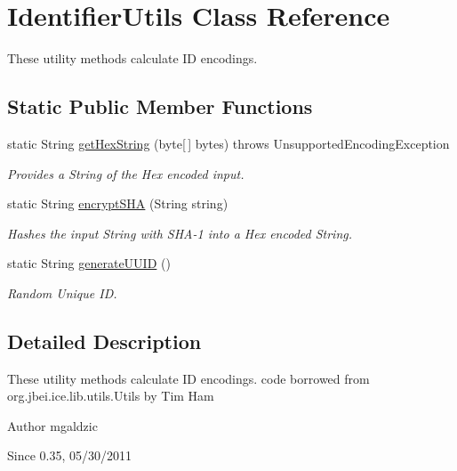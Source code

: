 \hypertarget{classorg_1_1sbolstandard_1_1lib_s_b_o_lj_1_1_identifier_utils}{
\section{IdentifierUtils Class Reference}
\label{classorg_1_1sbolstandard_1_1lib_s_b_o_lj_1_1_identifier_utils}
}


These utility methods calculate ID encodings.  


\subsection*{Static Public Member Functions}
\begin{DoxyCompactItemize}
\item 
static String \hyperlink{classorg_1_1sbolstandard_1_1lib_s_b_o_lj_1_1_identifier_utils_a703d02fbf288b0f4ea3f1a7af3b143dc}{getHexString} (byte\mbox{[}$\,$\mbox{]} bytes)  throws UnsupportedEncodingException 
\begin{DoxyCompactList}\small\item\em Provides a String of the Hex encoded input. \item\end{DoxyCompactList}\item 
static String \hyperlink{classorg_1_1sbolstandard_1_1lib_s_b_o_lj_1_1_identifier_utils_a3208b690b93a8287aeb551c699274213}{encryptSHA} (String string)
\begin{DoxyCompactList}\small\item\em Hashes the input String with SHA-\/1 into a Hex encoded String. \item\end{DoxyCompactList}\item 
static String \hyperlink{classorg_1_1sbolstandard_1_1lib_s_b_o_lj_1_1_identifier_utils_a84a93baf12201bb5cacb63a492ec824f}{generateUUID} ()
\begin{DoxyCompactList}\small\item\em Random Unique ID. \item\end{DoxyCompactList}\end{DoxyCompactItemize}


\subsection{Detailed Description}
These utility methods calculate ID encodings. code borrowed from org.jbei.ice.lib.utils.Utils by Tim Ham \begin{DoxyAuthor}{Author}
mgaldzic 
\end{DoxyAuthor}
\begin{DoxySince}{Since}
0.35, 05/30/2011 
\end{DoxySince}


